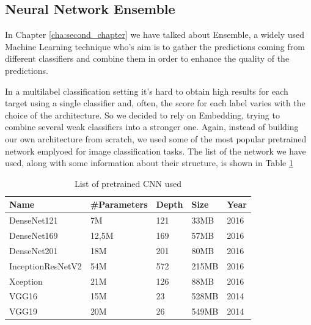 \subsection{Neural Network Ensemble}
\label{sec:nn_ensemble}
In Chapter \ref{cha:second_chapter} we have talked about Ensemble, a widely used Machine Learning technique who's aim is to gather the predictions coming from different classifiers and combine them in order to enhance the quality of the predictions.

\vspace{5mm}

In a multilabel classification setting it's hard to obtain high results for each target using a single classifier and, often, the score for each label varies with the choice of the architecture. So we decided to rely on Embedding, trying to combine several weak classifiers into a stronger one. Again, instead of building our own architecture from scratch, we used some of the most popular pretrained network emplyoed for image classification tasks. The list of the network we have used, along with some information about their structure, is shown in Table \ref{table:table_4.1}

\newpage

\begin{table}[h!]
\centering
\begin{tabular}{|l|l|l|l|l|} 
\hline
\textbf{Name}     & \textbf{\#Parameters} & \hfill\textbf{Depth} & \hfill\textbf{Size} & \hfill\textbf{Year}  \\ 
\hline
DenseNet121       & \hfill7M                    & \hfill121               &  \hfill33MB             & \hfill2016 \cite{densenet}              \\
DenseNet169       & \hfill12,5M                 & \hfill169               &   \hfill57MB            &     \hfill2016 \cite{densenet}           \\
DenseNet201       & \hfill18M                   & \hfill201              &   \hfill80MB           &        \hfill2016 \cite{densenet}        \\
InceptionResNetV2 & \hfill54M                   & \hfill572             &      \hfill215MB         &      \hfill2016 \cite{inceptionresnetv2}          \\
Xception          & \hfill21M                   &  \hfill126              &     \hfill88MB          &    \hfill2016 \cite{xception}            \\
VGG16             & \hfill15M                   &   \hfill23             &   \hfill528MB            &  \hfill2014 \cite{vgg16}               \\
VGG19             & \hfill20M                   &   \hfill26             &    \hfill549MB           &      \hfill2014 \cite{vgg16}           \\
\hline
\end{tabular}
\caption{List of pretrained CNN used}
\label{table:table_4.1}
\end{table}

